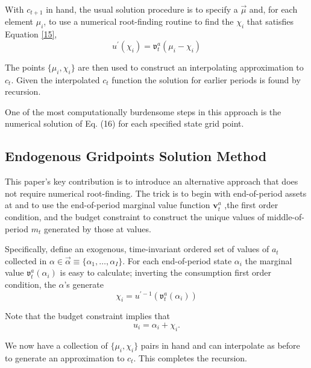 \documentclass[12pt]{article}
\theoremstyle{definition}
\begin{document}
With $c_{t+1}$ in hand, the usual solution procedure is to specify a $\overrightarrow{\mu}$ and, for each element $\mu_i$, to use a numerical root-finding routine to find the $\chi_i$ that satisfies Equation \ref{15},
\begin{equation}
	\label{16}
	u^{\prime}\left(\chi_i\right)=\boldsymbol{\mathfrak{v}}^a_t\left(\mu_i-\chi_i\right)
\end{equation}

The points $\{\mu_i, \chi_i\}$ are then used to construct an interpolating approximation to $c_t$. Given the interpolated $c_t$ function the solution for earlier periods is found by recursion.

One of the most computationally burdensome steps in this approach is the numerical solution of Eq. (16) for each specified state grid point.

\subsection{Endogenous Gridpoints Solution Method}

This paper's key contribution is to introduce an alternative approach that does not require numerical root-finding. The trick is to begin with end-of-period assets at and to use the end-of-period marginal value function $\mathbf{v}_t^a$ ,the first order condition, and the budget constraint to construct the unique values of middle-of-period $m_t$ generated by those at values.

Specifically, define an exogenous, time-invariant ordered set of values of $a_t$ collected in $\alpha \in \overrightarrow{\alpha} \equiv \{\alpha_1, \ldots, \alpha_I\}$. For each end-of-period state $\alpha_i$ the marginal value $\boldsymbol{\mathfrak{v}}_t^a(\alpha_i)$ is easy to calculate; inverting the consumption first order condition, the $\alpha$'s generate 
\begin{equation}
	\label{17}
	\chi_i=u^{\prime-1}\left(\boldsymbol{\mathfrak{v}}_t^a\left(\alpha_i\right)\right)
\end{equation}

Note that the budget constraint implies that 
\begin{equation}
	\label{18}
	u_i = \alpha_i + \chi_i.
\end{equation}

We now have a collection of $\{\mu_i, \chi_i\}$ pairs in hand and can interpolate as before to generate an approximation to $c_t$. This completes the recursion.
\end{document}
